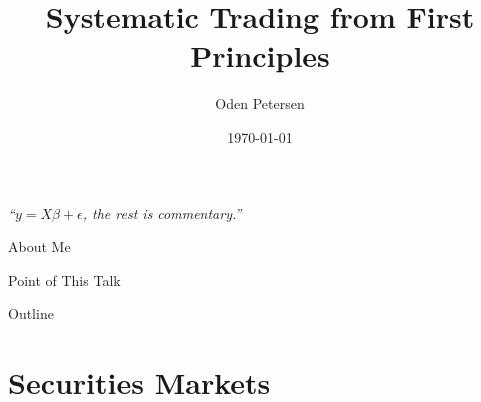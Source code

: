 \documentclass{beamer}
\title[Short Title]{Systematic Trading from First Principles}
\author[Your Name]{Oden Petersen}
\date{\today}
\begin{document}
\begin{frame}
	\titlepage
	\begin{center}
		\textit{``$y=X\beta+\epsilon$, the rest is commentary.''}
	\end{center}
\end{frame}

\begin{frame}{About Me}
\end{frame}

\begin{frame}{Point of This Talk}
\end{frame}
\begin{frame}{Outline}
	\tableofcontents
\end{frame}

\section{Securities Markets}
\end{document}
